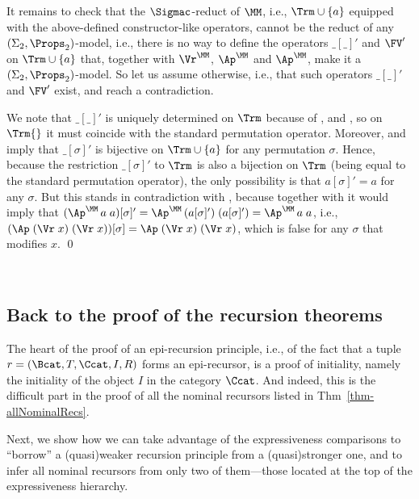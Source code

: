 It remains to check that the $\Sigmac$-reduct of $\MM$, i.e., $\Trm \cup \{a\}$ equipped with the above-defined constructor-like operators, cannot be the reduct of any $(\Sigma_2,\Props_2)$-model, i.e., there is no way to define the operators $\_[\_]'$ and $\FV'$ on $\Trm \cup \{a\}$ that, together with $\Vr^\MM$, $\Ap^\MM$ and $\Ap^\MM$, make it a $(\Sigma_2,\Props_2)$-model.  
So let us assume otherwise, 
i.e., that such operators $\_[\_]'$ and $\FV'$ exist, 
and reach a contradiction. 

We note that $\_[\_]'$ is uniquely determined on $\Trm$ because of \PmVr{}, \PmAp{} and \PmLm{}, so on $\Trm{}$ it must coincide with the standard permutation operator. Moreover, %
\PmId{} and \PmCp{} %
imply that $\_[\sigma]'$ is bijective on $\Trm \cup \{a\}$ for any %
permutation $\sigma$. 
Hence, because the restriction $\_[\sigma]'$ to $\Trm$ is also a bijection on $\Trm$ (being equal to the standard permutation operator), the only possibility is that $a[\sigma]' = a$ for any $\sigma$. But this stands in contradiction with \PmAp{}, because together with \PmAp{} it would imply that $(\Ap^\MM\,a\;a)[\sigma]' = \Ap^\MM\,(a[\sigma]')\;(a[\sigma]') = \Ap^\MM\,a\;a$, i.e., $(\Ap\;(\Vr\;x)\;(\Vr\;x))[\sigma] = \Ap\;(\Vr\;x)\;(\Vr\;x)$, %
which is false for any $\sigma$ that modifies $x$. 
%
\qed 
%


\ \\
\subsection{Back to the proof of the recursion theorems} 
\label{app-subsec-backToProofRecThms} 

The heart of the proof of an epi-recursion principle, 
i.e., of the fact that a tuple $r = (\Bcat,T,\Ccat,I,R)$ forms an epi-recursor, 
is a proof of initiality, namely the initiality of the object $I$ in the category $\Ccat$. And indeed, this is the difficult part in the proof of all the nominal recursors listed in Thm~\ref{thm-allNominalRecs}. 

Next, we show how we can take advantage of the expressiveness comparisons %
to ``borrow'' a (quasi)weaker recursion principle from a (quasi)stronger one, and to infer all nominal recursors from only two of them---those located at the top of the expressiveness hierarchy. 

